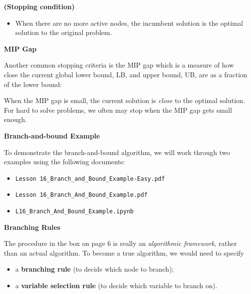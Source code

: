 \documentclass[11pt]{article}
\theoremstyle{definition}
\newcommand{\answerbox}[3]{%
  \fbox{%
    \begin{minipage}[#1]{#2}
      \hfill\vspace{#3}
    \end{minipage}
  }
}
\newcommand{\wordbox}{\answerbox{c}{1.2in}{.7cm}}
\begin{document}
\begin{tcolorbox}
\begin{itemize}
\begin{itemize}
\end{itemize}
\end{itemize}

\bigskip
\textbf{(Stopping condition)}
\begin{itemize}
\item When there are no more active nodes, the incumbent solution is the optimal solution to the original problem.
\end{itemize}
\end{tcolorbox}

\bigskip

\textbf{MIP Gap}

Another common stopping criteria is the MIP gap which is a measure of how close the current global lower bound, LB, and upper bound, UB, are as a fraction of the lower bound: \vspace{1in}

When the MIP gap is small, the current solution is \textit{close} to the optimal solution. For hard to solve problems, we often may stop when the MIP gap gets small enough.

\newpage

\textbf{Branch-and-bound Example}  

To demonstrate the branch-and-bound algorithm, we will work through two examples using the following  documents:

\begin{itemize}
\item  \texttt{Lesson 16\_Branch\_and\_Bound\_Example-Easy.pdf}
\item  \texttt{Lesson 16\_Branch\_And\_Bound\_Example.pdf}
\item  \texttt{L16\_Branch\_And\_Bound\_Example.ipynb}
\end{itemize}

\textbf{Branching Rules}

The procedure in the box on page 6 is really an \emph{algorithmic framework}, rather than an actual algorithm. 
To become a true algorithm, we would need to specify
\begin{itemize}
\item a \textbf{branching rule} (to decide which \wordbox node to branch);
\item a \textbf{variable selection rule} (to decide which \wordbox variable to branch on).
\end{itemize}
\end{document}
